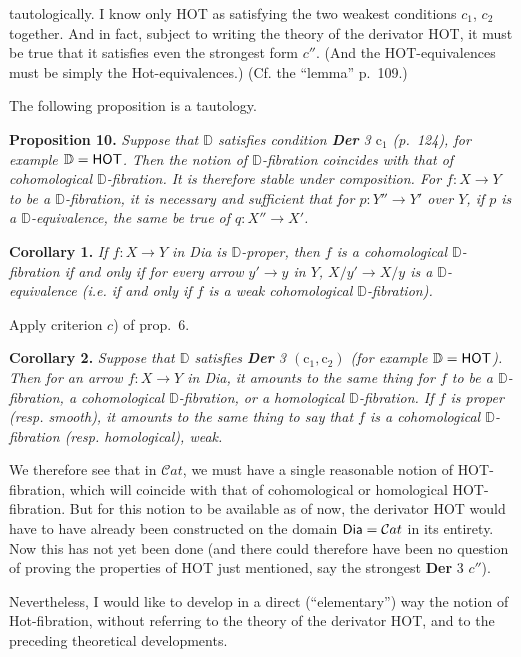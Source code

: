 \documentclass[11pt]{article}
\newcommand{\printedpage}[1]{\marginpar{\footnotesize p.~#1}}
\newcommand{\msp}[1]{\marginpar{\footnotesize [#1]}}
\newcommand{\HOT}{\textsf{HOT}}
\newcommand{\Hot}{\textsf{Hot}}
\newcommand{\Dia}{\textsf{Dia}}
\newcommand{\Cat}{\mathcal{C}at}
\newcommand{\D}{\mathbb{D}}
\begin{document}
\printedpage{74}
tautologically. I know only \HOT{} as satisfying the two weakest conditions $c_1$, $c_2$ together. And in fact, subject to writing the theory of the derivator \HOT, it must be true that it satisfies even the strongest form $c''$. (And the \HOT-equivalences must be simply the \Hot-equivalences.) (Cf. the ``lemma'' p.~109.)

The following proposition is a tautology.

\noindent\textbf{Proposition 10.} \textit{Suppose that $\D$ satisfies condition \textup{\textbf{Der} 3 $\mathrm{c}_1$ (p.~124),} for example $\D = \text{\HOT}$. Then the notion of $\D$-fibration coincides with that of cohomological $\D$-fibration. It is therefore stable under composition. For $f : X \to Y$ to be a $\D$-fibration, it is necessary and sufficient that for $p : Y'' \to Y'$ over $Y$, if $p$ is a $\D$-equivalence, the same be true of $q : X'' \to X'$.}

\noindent\textbf{Corollary 1.} \textit{If $f : X \to Y$ in \textup{\Dia} is $\D$-proper, then $f$ is a cohomological $\D$-fibration if and only if for every arrow $y' \to y$ in $Y$, $X/y' \to X/y$ is a $\D$-equivalence \textup{(i.e.} if and only if $f$ is a weak cohomological $\D$-fibration\textup{).}}

Apply criterion $c$) of prop.~6.

\msp{page 126}

\noindent\textbf{Corollary 2.} \textit{Suppose that $\D$ satisfies \textup{\textbf{Der} 3 $(\mathrm{c}_1, \mathrm{c}_2)$ (for example $\D = \text{\HOT}$).} Then for an arrow $f : X \to Y$ in \textup{\Dia}, it amounts to the same thing for $f$ to be a $\D$-fibration, a cohomological $\D$-fibration, or a homological $\D$-fibration. If $f$ is proper \textup{(resp.} smooth\textup{),} it amounts to the same thing to say that $f$ is a cohomological $\D$-fibration \textup{(resp.} homological\textup{),} weak.}

We therefore see that in $\Cat$, we must have a single reasonable notion of \HOT-fibration, which will coincide with that of cohomological or homological \HOT-fibration. But for this notion to be available as of now, the derivator \HOT{} would have to have already been constructed on the domain $\text{\Dia} = \Cat$ in its entirety. Now this has not yet been done (and there could therefore have been no question of proving the properties of \HOT{} just mentioned, say the strongest \textbf{Der} 3 $c''$).

Nevertheless, I would like to develop in a direct (``elementary'') way the notion of \Hot-fibration, without referring to the theory of the derivator \HOT, and to the preceding theoretical developments. %
\end{document}
